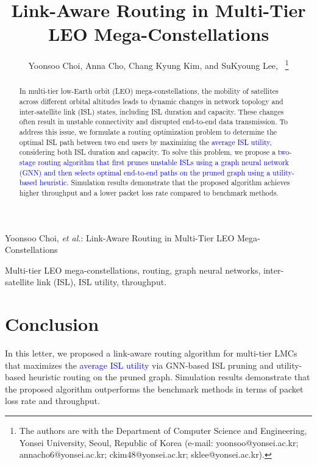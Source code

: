 \documentclass[lettersize,journal]{IEEEtran}
\begin{document}
\title{Link-Aware Routing in Multi-Tier LEO Mega-Constellations}
\author{Yoonsoo Choi, Anna Cho, Chang Kyung Kim, and SuKyoung Lee,~
\thanks{The authors are with the Department of Computer Science and Engineering, Yonsei University, Seoul, Republic of Korea (e-mail: yoonsoo@yonsei.ac.kr; annacho6@yonsei.ac.kr; ckim48@yonsei.ac.kr; sklee@yonsei.ac.kr).}
}
%
{Yoonsoo Choi, \MakeLowercase{\textit{et al.}}: Link-Aware Routing in Multi-Tier LEO Mega-Constellations}
\maketitle

\begin{abstract}
In multi-tier low-Earth orbit (LEO) mega-constellations, the mobility of satellites across different orbital altitudes leads to dynamic changes in network topology and inter-satellite link (ISL) states, including ISL duration and capacity. These changes often result in unstable connectivity and disrupted end-to-end data transmission. To address this issue, we formulate a routing optimization problem to determine the optimal ISL path between two end users by maximizing the \textcolor{blue}{average ISL utility}, considering both ISL duration and capacity. To solve this problem, we propose a \textcolor{blue}{two-stage routing algorithm that first prunes unstable ISLs using a graph neural network (GNN) and then selects optimal end-to-end paths on the pruned graph using a utility-based heuristic}. Simulation results demonstrate that the proposed algorithm achieves higher throughput and a lower packet loss rate compared to benchmark methods.
\end{abstract}

\begin{IEEEkeywords}
Multi-tier LEO mega-constellations, routing, graph neural networks, inter-satellite link (ISL), ISL utility, throughput.
\end{IEEEkeywords}

\vspace{-0.1cm}

\vspace{-0.1cm}



\section{Conclusion}
In this letter, we proposed a link-aware routing algorithm for multi-tier LMCs that maximizes the \textcolor{blue}{average ISL utility} via GNN-based ISL pruning and utility-based heuristic routing on the pruned graph. Simulation results demonstrate that the proposed algorithm outperforms the benchmark methods in terms of packet loss rate and throughput.



\end{document}
